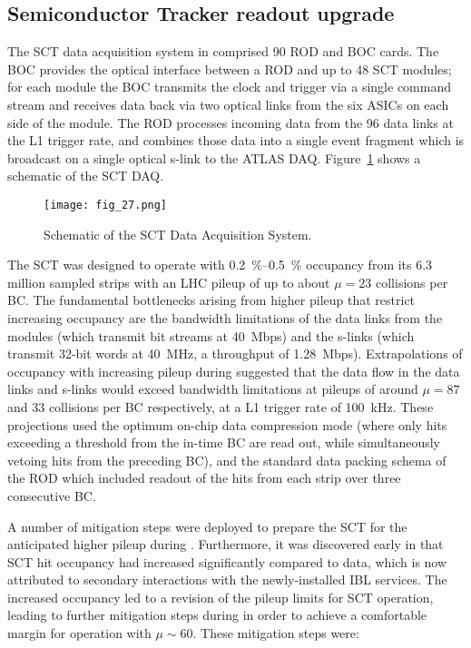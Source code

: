 \documentclass[cernpreprint, atlasdraft=false, UKenglish,british,orcidlogo, texmf, orcidlogo]{atlasdoc}
\begin{document}
 

\subsection{Semiconductor Tracker readout upgrade}
\label{sec:ID-SCT}
 
The \gls{SCT} data acquisition system in \RunOne comprised \num{90} \gls{ROD} and \gls{BOC} cards.  The \gls{BOC} provides the optical interface between a \gls{ROD} and up to \num{48} \gls{SCT} modules; for each module the \gls{BOC} transmits the clock and trigger via a single command  stream and receives data back via two optical links from the six \glspl{ASIC} on each side of the module. The \gls{ROD} processes incoming data from the \num{96} data links at the \gls{L1} trigger rate, and combines those data into a single event fragment which is broadcast on a single optical \gls{s-link} to the ATLAS \gls{DAQ}. Figure~\ref{fig:SCT_DAQ} shows a schematic of the \gls{SCT} \gls{DAQ}.
 
\begin{figure}
\centering
\texttt{[image: fig\_27.png]}
\caption{Schematic of the \gls{SCT} Data Acquisition System.}
\label{fig:SCT_DAQ}
\end{figure}
 
The \gls{SCT} was designed to operate with \SIrange{0.2}{0.5}{\percent} occupancy from its 6.3 million sampled strips with an \gls{LHC} pileup of up to about $\mu=23$ \pp collisions per \gls{BC}. The fundamental bottlenecks arising from higher pileup that restrict increasing occupancy are the bandwidth limitations of the data links from the modules (which transmit bit streams at \SI{40}{Mbps}) and the \glspl{s-link} (which transmit 32-bit words at \SI{40}{\MHz}, a throughput of \SI{1.28}{Mbps}). Extrapolations of occupancy with increasing pileup during \RunOne suggested that the data flow in the data links and \glspl{s-link} would exceed bandwidth limitations at pileups of around $\mu=87$ and \num{33} \pp collisions per \gls{BC} respectively, at a \gls{L1} trigger rate of \SI{100}{\kHz}. These projections used the optimum on-chip data compression mode (where only hits exceeding a threshold from the in-time \gls{BC} are read out, while simultaneously vetoing hits from the preceding \gls{BC}), and the standard data packing schema of the \gls{ROD} which included readout of the hits from each strip over three consecutive \gls{BC}.
 
A number of mitigation steps were deployed to prepare the \gls{SCT} for the anticipated higher pileup during \RunTwo. Furthermore, it was discovered early in \RunTwo that \gls{SCT} hit occupancy had increased significantly compared to \RunOne data, which is now attributed to secondary interactions with the newly-installed \gls{IBL} services. The increased occupancy led to a revision of the pileup limits for \gls{SCT} operation, leading to further mitigation steps during \RunTwo in order to achieve a comfortable margin for operation with $\mu\sim 60$. These mitigation steps
were:
 
\end{document}

